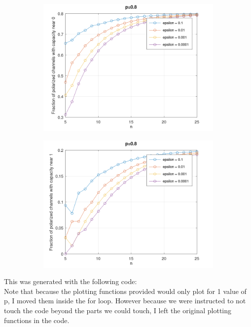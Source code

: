 \documentclass[a4paper,10pt]{article}
\begin{document}
\begin{figure}[H]
    \centering
    \begin{subfigure}{.5\textwidth}
\includegraphics[width=.9\linewidth]{code/p=0.8 near 0.png}
    \end{subfigure}%
    \begin{subfigure}{.5\textwidth}
\includegraphics[width=.9\linewidth]{code/p=0.8 near 1.png}
    \end{subfigure}
\end{figure}
This was generated with the following code:\\

Note that because the plotting functions provided would only
plot for 1 value of p, I moved them inside the for loop. However because
we were instructed to not touch the code beyond the parts we could touch,
I left the original plotting functions in the code.
\end{document}
